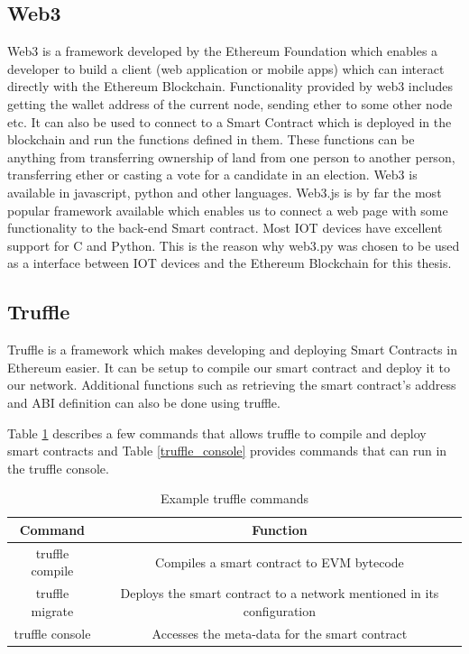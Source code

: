 \documentclass[11pt,openright]{report}
\begin{document}
\subsection{Web3}
Web3 is a framework developed by the Ethereum Foundation which enables a developer to build a client (web application or mobile apps) which can interact directly with the Ethereum Blockchain. Functionality provided by web3 includes getting the wallet address of the current node, sending ether to some other node etc. It can also be used to connect to a Smart Contract which is deployed in the blockchain and run the functions defined in them. These functions can be anything from transferring ownership of land from one person to another person, transferring ether or casting a vote for a candidate in an election. Web3 is available in javascript, python and other languages. Web3.js is by far the most popular framework available which enables us to connect a web page with some functionality to the back-end Smart contract. Most IOT devices have excellent support for C and Python. This is the reason why web3.py was chosen to be used as a interface between IOT devices and the Ethereum Blockchain for this thesis.

\subsection{Truffle}
Truffle is a framework which makes developing and deploying Smart Contracts in Ethereum easier. It can be setup to compile our smart contract and deploy it to our network. Additional functions such as retrieving the smart contract's address and ABI definition can also be done using truffle.

Table \ref{truffle_commands} describes a few commands that allows truffle to compile and deploy smart contracts and Table \ref{truffle_console} provides commands that can run in the truffle console.

\begin{table}[!htbp]
	\renewcommand{\arraystretch}{1.3}
	\caption{Example truffle commands}
	\label{truffle_commands}
	\centering
	\begin{tabular}{|c|c|}
		\hline
		\bfseries Command & \bfseries Function \\
		\hline\hline
		truffle compile & Compiles a smart contract to EVM bytecode \\ \hline
		truffle migrate & Deploys the smart contract to a network mentioned in its configuration \\ \hline
		truffle console & Accesses the meta-data for the smart contract \\ \hline
	\end{tabular}
\end{table}
\end{document}
